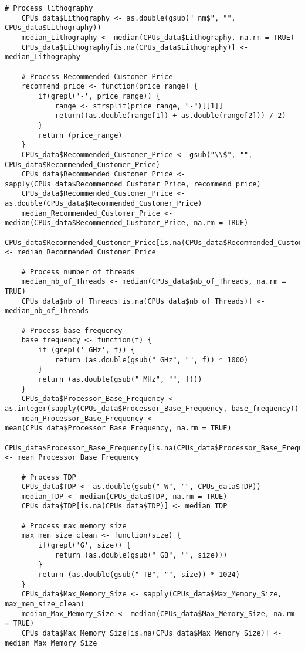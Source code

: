 \documentclass[a4paper]{article}
\begin{document}
	\begin{lstlisting}[frame=single, backgroundcolor=\color{gray!10}, breaklines=true, columns=fullflexible]
	# Process lithography
	CPUs_data$Lithography <- as.double(gsub(" nm$", "", CPUs_data$Lithography))
	median_Lithography <- median(CPUs_data$Lithography, na.rm = TRUE)
	CPUs_data$Lithography[is.na(CPUs_data$Lithography)] <- median_Lithography
	
	# Process Recommended Customer Price
	recommend_price <- function(price_range) {
		if(grepl('-', price_range)) {
			range <- strsplit(price_range, "-")[[1]]
			return((as.double(range[1]) + as.double(range[2])) / 2)
		}
		return (price_range)
	}
	CPUs_data$Recommended_Customer_Price <- gsub("\\$", "", CPUs_data$Recommended_Customer_Price)
	CPUs_data$Recommended_Customer_Price <- sapply(CPUs_data$Recommended_Customer_Price, recommend_price) 
	CPUs_data$Recommended_Customer_Price <- as.double(CPUs_data$Recommended_Customer_Price)
	median_Recommended_Customer_Price <- median(CPUs_data$Recommended_Customer_Price, na.rm = TRUE)
	CPUs_data$Recommended_Customer_Price[is.na(CPUs_data$Recommended_Customer_Price)] <- median_Recommended_Customer_Price
	
	# Process number of threads
	median_nb_of_Threads <- median(CPUs_data$nb_of_Threads, na.rm = TRUE)
	CPUs_data$nb_of_Threads[is.na(CPUs_data$nb_of_Threads)] <- median_nb_of_Threads
	
	# Process base frequency
	base_frequency <- function(f) {
		if (grepl(' GHz', f)) {
			return (as.double(gsub(" GHz", "", f)) * 1000)
		}
		return (as.double(gsub(" MHz", "", f)))
	}
	CPUs_data$Processor_Base_Frequency <- as.integer(sapply(CPUs_data$Processor_Base_Frequency, base_frequency))
	mean_Processor_Base_Frequency <- mean(CPUs_data$Processor_Base_Frequency, na.rm = TRUE)
	CPUs_data$Processor_Base_Frequency[is.na(CPUs_data$Processor_Base_Frequency)] <- mean_Processor_Base_Frequency
	
	# Process TDP
	CPUs_data$TDP <- as.double(gsub(" W", "", CPUs_data$TDP))
	median_TDP <- median(CPUs_data$TDP, na.rm = TRUE)
	CPUs_data$TDP[is.na(CPUs_data$TDP)] <- median_TDP
	
	# Process max memory size
	max_mem_size_clean <- function(size) {  
		if(grepl('G', size)) {
			return (as.double(gsub(" GB", "", size)))
		}
		return (as.double(gsub(" TB", "", size)) * 1024)
	}
	CPUs_data$Max_Memory_Size <- sapply(CPUs_data$Max_Memory_Size, max_mem_size_clean)     
	median_Max_Memory_Size <- median(CPUs_data$Max_Memory_Size, na.rm = TRUE)
	CPUs_data$Max_Memory_Size[is.na(CPUs_data$Max_Memory_Size)] <- median_Max_Memory_Size
	\end{lstlisting}
\end{document}
